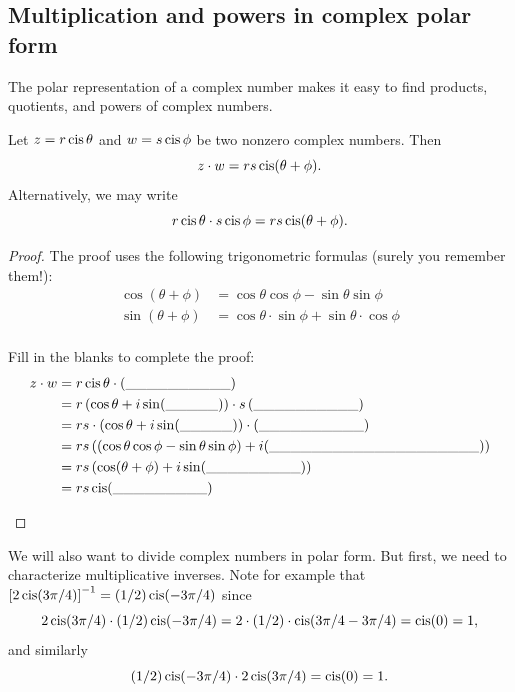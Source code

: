 {\subsection{Multiplication and powers in complex polar form}

The polar representation of a complex number makes it easy to find
products, quotients, and powers of complex numbers. 

\begin{prop}\label{proposition:complex:polar_mult} Let $z=r\operatorname{cis}\theta$ and $w=s\operatorname{cis}\phi$
be two nonzero complex numbers. Then 
\[z \cdot w=rs\operatorname{cis}(\theta+\phi).\]
Alternatively, we may write
\[r \operatorname{cis} \theta \cdot s \operatorname{cis} \phi =rs\operatorname{cis}(\theta+\phi).\]
 \end{prop}

\begin{proof}
The proof uses the following trigonometric formulas (surely you remember them!):
\newline
\begin{align*}
 \cos(\theta + \phi ) &= \cos\theta\cos\phi - \sin\theta\sin\phi \\
 \sin(\theta + \phi ) &= \cos\theta \cdot \sin\phi + \sin\theta \cdot \cos\phi \\
\end{align*}
\begin{exercise}\label{exercise:complex:24} Fill in the blanks to complete the proof:
\begin{align*}
z \cdot w &= r\operatorname{cis}\theta \cdot (\_\_\_\_\_\_\_\_\_\_) \\
 &= r \left( \cos\theta + i \sin(\_\_\_\_\_) \right) \cdot s  \left( \_\_\_\_\_\_\_\_\_\_ \right) \\
 &=  rs \cdot \left( \cos\theta + i \sin(\_\_\_\_\_) \right) \cdot  \left( \_\_\_\_\_\_\_\_\_\_\right) \\
 &=  rs \left( (\cos\theta \cos\phi   - \sin\theta \sin\phi)  + i(\_\_\_\_\_\_\_\_\_\_\_\_\_\_\_\_\_\_\_\_) \right)\\
 &=  rs  \left( \cos(\theta + \phi) + i\sin( \_\_\_\_\_\_\_\_\_) \right) \\
 &=  r s  \operatorname{cis}( \_\_\_\_\_\_\_\_\_) \\
\end{align*}
\end{exercise}
\end{proof}

We will also want to divide complex numbers in polar form. But first, we need to characterize multiplicative inverses. Note for example that $\left[2 \operatorname{cis} (3\pi / 4)\right]^{-1} = (1/2) \operatorname{cis} (-3 \pi/4)$ since
\[ 2 \operatorname{cis} (3\pi / 4) \cdot (1/2) \operatorname{cis} (-3 \pi/4) = 2 \cdot (1/2) \cdot \operatorname{cis}( 3\pi/4 -3 \pi /4) = \operatorname{cis}(0) = 1, \]
and similarly
\[ (1/2) \operatorname{cis} (-3 \pi/4) \cdot 2 \operatorname{cis} (3\pi / 4)  = \operatorname{cis}(0) = 1. \]

}
